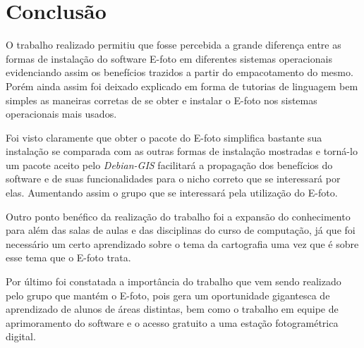 \chapter{Conclusão}

O trabalho realizado permitiu que fosse percebida a grande diferença entre as formas de instalação do software E-foto em diferentes sistemas operacionais evidenciando assim os benefícios trazidos a partir do empacotamento do mesmo. Porém ainda assim foi deixado explicado em forma de tutorias de linguagem bem simples as maneiras corretas de se obter e instalar o E-foto nos sistemas operacionais mais usados.

Foi visto claramente que obter o pacote do E-foto simplifica bastante sua instalação se comparada com as outras formas de instalação mostradas e torná-lo um pacote aceito pelo \textit{Debian-GIS} facilitará a propagação dos benefícios do software e de suas funcionalidades para o nicho correto que se interessará por elas. Aumentando assim o grupo que se interessará pela utilização do E-foto. 

Outro ponto benéfico da realização do trabalho foi a expansão do conhecimento para além das salas de aulas e das disciplinas do curso de computação, já que foi necessário um certo aprendizado sobre o tema da cartografia uma vez que é sobre esse tema que o E-foto trata.

Por último foi constatada a importância do trabalho que vem sendo realizado pelo grupo que mantém o E-foto, pois gera um oportunidade gigantesca de aprendizado de alunos de áreas distintas, bem como o trabalho em equipe de aprimoramento do software e o acesso gratuito a uma estação fotogramétrica digital.     
